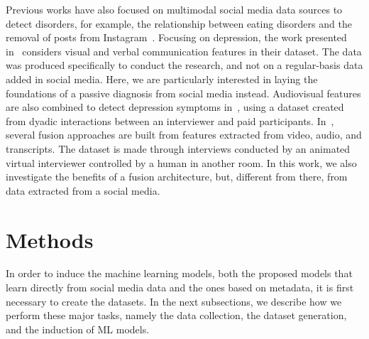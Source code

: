 \documentclass[letterpaper]{article} \usepackage{aaai20}  \usepackage{times}  \usepackage{helvet} \usepackage{courier}  \usepackage[hyphens]{url}  \usepackage{graphicx} \urlstyle{rm} \def\UrlFont{\rm}  \usepackage{graphicx}  \frenchspacing  \setlength{\pdfpagewidth}{8.5in}  \setlength{\pdfpageheight}{11in}  \usepackage[final]{changes}
\begin{document}
Previous works have also focused on multimodal social media data sources to detect disorders, for example, the relationship between eating disorders and the removal of posts from Instagram~\cite{chancellor2016post}. Focusing on depression, the work presented in~\cite{victor2019detecting} considers visual and verbal communication features in their dataset. The data was produced specifically to conduct the research, and not on a regular-basis data added in social media. Here, we are particularly interested in laying the foundations of a passive diagnosis from social media instead. Audiovisual features are also combined to detect depression symptoms in~\cite{scherer2014automatic}, using a dataset created from dyadic interactions between an interviewer and paid participants. In~\cite{morales2018linguistically}, several fusion approaches are built from features extracted from video, audio, and transcripts. The dataset is made through interviews conducted by an animated virtual interviewer controlled by a human in another room. In this work, we also investigate the benefits of a fusion architecture, but, different from there, from data extracted from a social media.


\section{Methods}\label{sec:methodology}
In order to induce the machine learning models, both the proposed models that learn directly from social media data and the ones based on metadata, it is first necessary to create the datasets. In the next subsections, we describe how we perform these major tasks, namely the data collection, the dataset generation, and the induction of ML models.
\end{document}
